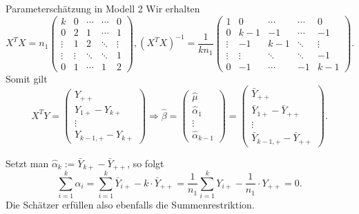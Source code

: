 \begin{karte}{Parameterschätzung in Modell 2}
Wir erhalten \[ X^T X = n_1 \begin{pmatrix}
    k & 0 & \cdots & \cdots & 0 \\
    0 & 2 & 1 & \cdots & 1 \\
    \vdots & 1 & 2 & \ddots & \vdots \\
    \vdots & \vdots & \ddots & \ddots & 1 \\
    0 & 1 & \cdots & 1 & 2
\end{pmatrix}, (X^T X)^{-1} = \frac{1}{k n_1} \begin{pmatrix}
    1 & 0 & \cdots & \cdots & 0 \\
    0 & k-1 & -1 & \cdots & -1 \\
    \vdots & -1 & k-1 & \ddots & \vdots \\
    \vdots & \vdots & \ddots & \ddots & -1 \\
    0 & -1 & \cdots & -1 & k-1
\end{pmatrix}. \]
Somit gilt 
\[ X^T Y = \begin{pmatrix}
    Y_{++} \\ Y_{1+} - Y_{k+} \\ \vdots \\ Y_{k-1,+} - Y_{k+} 
\end{pmatrix} \Rightarrow \hat{\beta} = \begin{pmatrix}
    \hat{\mu} \\ \hat{\alpha}_1 \\ \vdots \\ \hat{\alpha}_{k-1}
\end{pmatrix} = \begin{pmatrix}
    \bar{Y}_{++} \\
    \bar{Y}_{1+} - \bar{Y}_{++} \\
    \vdots \\
    \bar{Y}_{k-1,+} - \bar{Y}_{++}
\end{pmatrix}. \]

Setzt man \(\hat{\alpha}_k := \bar{Y}_{k+} - \bar{Y}_{++}\), so folgt 
\[ \sum_{i=1}^k \hat{\alpha}_i = \sum_{i=1}^k \bar{Y}_{i+} - k\cdot \bar{Y}_{++} = \frac{1}{n_1} \sum_{i=1}^k Y_{i+} - \frac{1}{n_1} \cdot Y_{++} = 0. \]
Die Schätzer erfüllen also ebenfalls die Summenrestriktion.
\end{karte}

